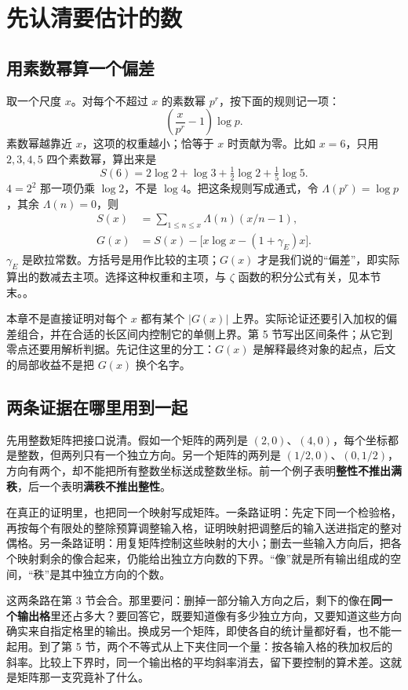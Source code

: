 \section{先认清要估计的数}
\subsection{用素数幂算一个偏差}
取一个尺度 $x$。对每个不超过 $x$ 的素数幂 $p^r$，按下面的规则记一项：
\[
       \left(\frac{x}{p^r}-1\right)\log p.
\]
素数幂越靠近 $x$，这项的权重越小；恰等于 $x$ 时贡献为零。比如 $x=6$，只用 $2,3,4,5$ 四个素数幂，算出来是
\[
 S(6)=2\log2+\log3+\tfrac12\log2+\tfrac15\log5.
\]
$4=2^2$ 那一项仍乘 $\log 2$，不是 $\log4$。把这条规则写成通式，令 $\Lambda(p^r)=\log p$，其余 $\Lambda(n)=0$，则
\[
 \begin{aligned}
 S(x)&=\sum_{1\le n\le x}\Lambda(n)(x/n-1),\\
 G(x)&=S(x)-\bigl[x\log x-(1+\gamma_E)x\bigr].
 \end{aligned}
\]
$\gamma_E$ 是欧拉常数。方括号是用作比较的主项；$G(x)$ 才是我们说的“偏差”，即实际算出的数减去主项。选择这种权重和主项，与 $\zeta$ 函数的积分公式有关，见本节末。。

本章不是直接证明对每个 $x$ 都有某个 $|G(x)|$ 上界。实际论证还要引入加权的偏差组合，并在合适的长区间内控制它的单侧上界。第 5 节写出区间条件；从它到零点还要用解析判据。先记住这里的分工：$G(x)$ 是解释最终对象的起点，后文的局部收益不是把 $G(x)$ 换个名字。

\subsection{两条证据在哪里用到一起}
先用整数矩阵把接口说清。假如一个矩阵的两列是 $(2,0)$、$(4,0)$，每个坐标都是整数，但两列只有一个独立方向。另一个矩阵的两列是 $(1/2,0)$、$(0,1/2)$，方向有两个，却不能把所有整数坐标送成整数坐标。前一个例子表明\textbf{整性不推出满秩}，后一个表明\textbf{满秩不推出整性}。

在真正的证明里，也把同一个映射写成矩阵。一条路证明：先定下同一个检验格，再按每个有限处的整除预算调整输入格，证明映射把调整后的输入送进指定的整对偶格。另一条路证明：用复矩阵控制这些映射的大小；删去一些输入方向后，把各个映射剩余的像合起来，仍能给出独立方向数的下界。“像”就是所有输出组成的空间，“秩”是其中独立方向的个数。

这两条路在第 3 节会合。那里要问：删掉一部分输入方向之后，剩下的像在\textbf{同一个输出格}里还占多大？要回答它，既要知道像有多少独立方向，又要知道这些方向确实来自指定格里的输出。换成另一个矩阵，即使各自的统计量都好看，也不能一起用。到了第 5 节，两个不等式从上下夹住同一个量：按各输入格的秩加权后的斜率。比较上下界时，同一个输出格的平均斜率消去，留下要控制的算术差。这就是矩阵那一支究竟补了什么。

